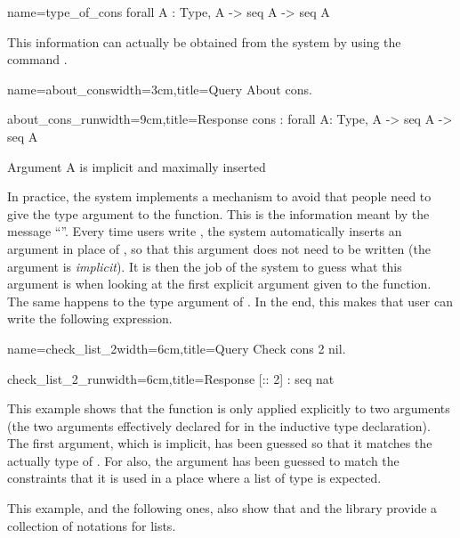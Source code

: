 \begin{coq}{name=type_of_cons}{}
  forall A : Type, A -> seq A -> seq A
\end{coq}
This information can actually be obtained from the system by using the 
command .

\begin{coq}{name=about_cons}{width=3cm,title=Query}
About cons.
$~$
$~$
\end{coq}
\begin{coqout}{about_cons_run}{width=9cm,title=Response}
cons : forall A: Type, A -> seq A -> seq A

Argument A is implicit and maximally inserted
\end{coqout}

In practice, the \Coq{} system implements a mechanism to avoid that
people need to give the type argument to the  function.  This is
the information meant by the message ``''.  Every time users write , the system automatically
inserts an argument in place of , so that this argument does not
need to be written (the argument is {\em implicit}).  It is then the
job of the \Coq{} system to guess what this argument is when looking at
the first explicit argument given to the function.  The same happens
to the type argument of .  In the end, this makes that user can
write the following expression.

\begin{coq}{name=check_list_2}{width=6cm,title=Query}
Check cons 2 nil.
\end{coq}
\begin{coqout}{check_list_2_run}{width=6cm,title=Response}
[:: 2] : seq nat
\end{coqout}
\index[coq]{\C{(_ :: _)}}
This example shows that the function  is only applied
explicitly to two arguments (the two arguments effectively declared
for  in the inductive type declaration).
The first argument, which is implicit,
has been guessed so that it matches the actually type of .  For 
 also, the argument has been guessed to match the constraints
that it is used in a place where a list of type  is expected.  

This example, and the following ones, also show
that \Coq{} and the \mcbMC{} library provide
a collection of notations for lists.

